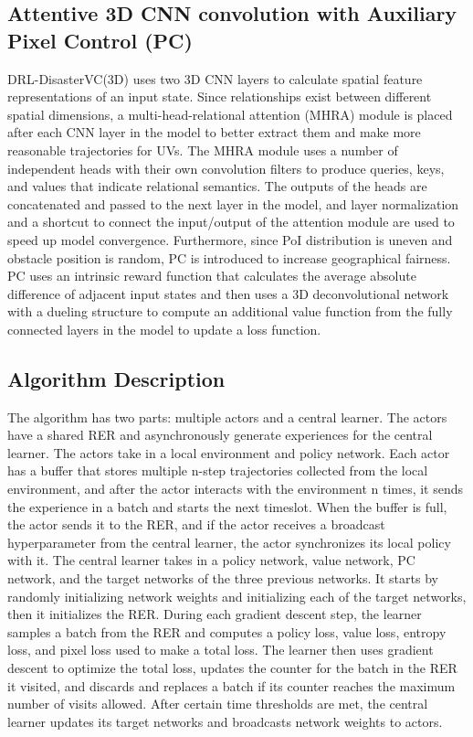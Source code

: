 \documentclass[sigconf, natbib=false]{acmart}
\begin{document}
   \subsection{Attentive 3D CNN convolution with Auxiliary Pixel Control (PC)}
   DRL-DisasterVC(3D) uses two 3D CNN layers to calculate spatial feature representations of an input state. Since relationships exist between different spatial dimensions, a multi-head-relational attention (MHRA) module is placed after each CNN layer in the model to better extract them and make more reasonable trajectories for UVs. The MHRA module uses a number of independent heads with their own convolution filters to produce queries, keys, and values that indicate relational semantics. The outputs of the heads are concatenated and passed to the next layer in the model, and layer normalization and a shortcut to connect the input/output of the attention module are used to speed up model convergence. Furthermore, since PoI distribution is uneven and obstacle position is random, PC is introduced to increase geographical fairness. PC uses an intrinsic reward function that calculates the average absolute difference of adjacent input states and then uses a 3D deconvolutional network with a dueling structure to compute an additional value function from the fully connected layers in the model to update a loss function.
   
   \subsection{Algorithm Description}
   The algorithm has two parts: multiple actors and a central learner. The actors have a shared RER and asynchronously generate experiences for the central learner. The actors take in a local environment and policy network. Each actor has a buffer that stores multiple n-step trajectories collected from the local environment, and after the actor interacts with the environment n times, it sends the experience in a batch and starts the next timeslot. When the buffer is full, the actor sends it to the RER, and if the actor receives a broadcast hyperparameter from the central learner, the actor synchronizes its local policy with it. The central learner takes in a policy network, value network, PC network, and the target networks of the three previous networks. It starts by randomly initializing network weights and initializing each of the target networks, then it initializes the RER. During each gradient descent step, the learner samples a batch from the RER and computes a policy loss, value loss, entropy loss, and pixel loss used to make a total loss. The learner then uses gradient descent to optimize the total loss, updates the counter for the batch in the RER it visited, and discards and replaces a batch if its counter reaches the maximum number of visits allowed. After certain time thresholds are met, the central learner updates its target networks and broadcasts network weights to actors.
\end{document}
